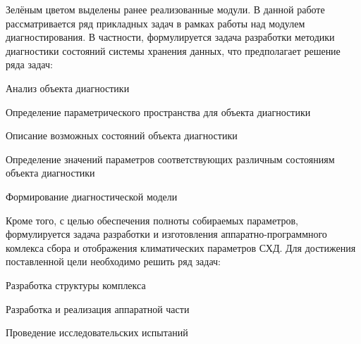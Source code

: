 Зелёным цветом выделены ранее реализованные модули.
В данной работе рассматривается ряд прикладных задач в рамках работы над модулем диагностирования. В частности, формулируется задача разработки методики диагностики состояний системы хранения данных, что предполагает решение ряда задач:
\begin{itemize*}
	\item{Анализ объекта диагностики}
	\item{Определение параметрического пространства для объекта диагностики}
	\item{Описание возможных состояний объекта диагностики}
	\item{Определение значений параметров соответствующих различным состояниям объекта диагностики}
	\item{Формирование диагностической модели}
\end{itemize*}
Кроме того, с целью обеспечения полноты собираемых параметров, формулируется задача разработки и изготовления аппаратно-программного комлекса сбора и отображения климатических параметров СХД. Для достижения поставленной цели необходимо решить ряд задач: 
\begin{itemize*}
	\item{Разработка структуры комплекса}
	\item{Разработка и реализация аппаратной части}
	\item{Проведение исследовательских испытаний}
\end{itemize*}	 

 

